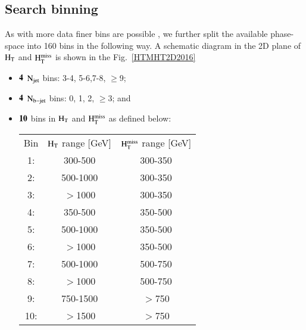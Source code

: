 \subsection{Search binning}

As with more data finer bins are possible , we further split the available phase-space into 160 bins in the following way. A schematic diagram in the 2D plane of $\rm H_{T}$ and $\rm H_{T}^{miss}$ is shown in the Fig.~\ref{HTMHT2D2016} 

\begin{itemize}

 \item ${\bf 4 }$ $\rm N_{jet}$ bins: 3-4, 5-6,7-8, $\geq$9; \vspace{-0.2in}
 \item ${\bf 4 }$ $\rm N_{b-jet}$ bins: 0, 1, 2, $\geq$3; and \vspace{-0.2in}
 \item  ${\bf 10 }$ bins in $\rm H_{T}$ and $\rm H_{T}^{miss}$ as defined below:



\begin{center} \label{HTMHT2D2016}
\begin{tabular}{ c c c }
 Bin & $\rm H_{T}$ range [GeV] & $\rm H_{T}^{miss}$ range [GeV] \\ 
  1: & 300-500 & 300-350 \\ 

  2: & 500-1000 & 300-350 \\  

  3: & $>$1000 & 300-350\\

  4:&  350-500 & 350-500\\

  5: & 500-1000 & 350-500\\

  6: & $>$1000 & 350-500\\

  7: & 500-1000 & 500-750\\

  8: & $>$1000 & 500-750\\

  9: & 750-1500 & $>$750\\

 10: & $>$1500 & $>$750\\


\end{tabular}
\end{center}

\end{itemize}
 

